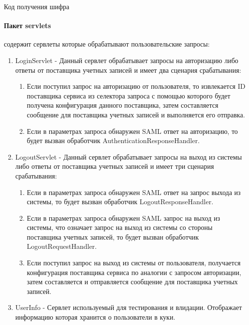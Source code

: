 \begin{listing}[H]
\inputminted[linenos,frame=single]{java}{inc/src/cipher}
\caption{Код получения шифра} 
\label{lst:cipher}
\end{listing}

\paragraph{Пакет servlets} содержит сервлеты которые обрабатывают пользовательские запросы:
\begin{enumerate}
\item LoginServlet - Данный сервлет обрабатывает запросы на авторизацию либо ответы от поставщика учетных записей и имеет два сценария срабатывания:
\begin{enumerate}
\item Если поступил запрос на авторизацию от пользователя, то извлекается ID поставщика сервиса из селектора запроса с помощью которого будет получена конфигурация данного поставщика, затем составляется сообщение для поставщика учетных записей и выполняется его отправка.
\item Если в параметрах запроса обнаружен SAML ответ на авторизацию, то будет вызван обработчик AuthenticationResponseHandler.
\end{enumerate}
\item LogoutServlet -  Данный сервлет обрабатывает запросы на выход из системы либо ответы от поставщика учетных записей и имеет три сценария срабатывания:
\begin{enumerate}
\item Если в параметрах запроса обнаружен SAML ответ на запрос выхода из системы, то будет вызван обработчик LogoutResponseHandler. 
\item Если в параметрах запроса обнаружен SAML запрос на выход из системы, что означает запрос на выход из системы со стороны поставщика учетных записей, то будет вызван обработчик LogoutRequestHandler. 
\item Если поступил запрос на выход из системы от пользователя, получается конфигурация поставщика сервиса по аналогии с запросом авторизации, затем составляется и отправляется сообщение для поставщика учетных записей.
\end{enumerate}
\item UserInfo - Сервлет используемый для тестирования и влидации. Отображает информацию которая хранится о пользователи в куки.
\end{enumerate}

